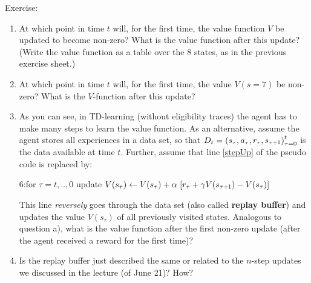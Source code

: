 Exercise:
\begin{enumerate}
\item At which point in time $t$ will, for the first time, the value function $V$ be updated to become non-zero? What is the value function after this update? (Write the value function as a table over the 8 states, as in the previous exercise sheet.)

\item At which point in time $t$ will, for the first time, the value $V(s=7)$ be non-zero? What is the $V$-function after this update?

\item As you can see, in TD-learning (without eligibility traces) the agent has to make many steps to learn the value function. As an alternative, assume the agent stores all experiences in a data set, so that $D_t={(s_\tau,a_\tau,r_\tau,s_{\tau{{\hspace*{-.0pt}\text{\rm +}\hspace*{-.5pt}}1}})}_{\tau=0}^t$ is the data available at time $t$. Further, assume that line \ref{stepUp} of the pseudo code is replaced by:

6:\quad for $\tau=t,..,0$ update $V(s_\tau) \gets V(s_\tau) + \alpha~ [r_\tau + \gamma V(s_{\tau{{\hspace*{-.0pt}\text{\rm +}\hspace*{-.5pt}}1}}) - V(s_\tau)]$

This line \emph{reversely} goes through the data set (also called \textbf{replay buffer}) and updates the value $V(s_\tau)$ of all previously visited states. Analogous to question a), what is the value function after the first non-zero update (after the agent received a reward for the first time)?

\item Is the replay buffer just described the same or related to the $n$-step updates we discussed in the lecture (of June 21)? How?
\end{enumerate}

